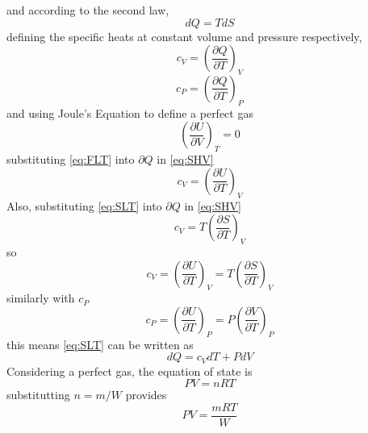 %
%
%
and according to the second law,
\begin{equation}\label{eq:SLT}
dQ=TdS
\end{equation}%
%
defining the specific heats at constant volume and pressure respectively,
\begin{equation}\label{eq:SHV}
c_V=\left(\frac{\partial Q}{\partial T}\right)_V
\end{equation}
\begin{equation}\label{eq:SHP}
c_P=\left(\frac{\partial Q}{\partial T}\right)_P
\end{equation}
and using Joule's Equation to define a perfect gas
\begin{equation}\label{eq:Joule}
\left(\frac{\partial U}{\partial V}\right)_T=0
\end{equation}
substituting \ref{eq:FLT} into $\partial Q$ in \ref{eq:SHV}
\begin{equation}
c_V=\left(\frac{\partial U}{\partial T}\right)_V
\end{equation}
Also, substituting \ref{eq:SLT} into $\partial Q$ in \ref{eq:SHV}
\begin{equation}
c_V=T\left(\frac{\partial S}{\partial T}\right)_V
\end{equation}
so
\begin{equation}\label{eq:cV}
c_V=\left(\frac{\partial U}{\partial T}\right)_V=T\left(\frac{\partial S}{\partial T}\right)_V
\end{equation}
similarly with $c_P$
\begin{equation}\label{cP}
c_P=\left(\frac{\partial U}{\partial T}\right)_P=P\left(\frac{\partial V}{\partial T}\right)_P
\end{equation}
this means \ref{eq:SLT} can be written as
\begin{equation}\label{eq:NewSLT}
dQ=c_VdT+PdV
\end{equation}
Considering a perfect gas, the equation of state is
\begin{equation}\label{eq:IGL}
PV=nRT
\end{equation}%
%
substitutting $n=m/W$ provides%
\begin{equation}
PV=\frac{mRT}{W}
\end{equation}
